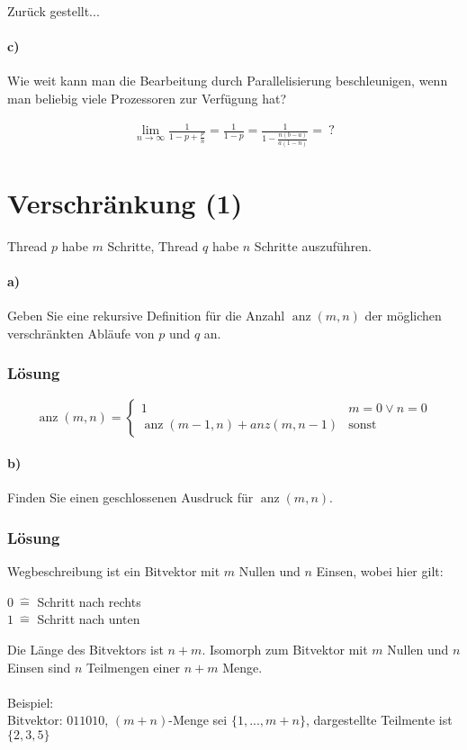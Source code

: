 \documentclass[a4paper]{scrartcl}
\DeclareMathOperator{\anz}{anz}
\begin{document}
Zurück gestellt...

\paragraph{c)} Wie weit kann man die Bearbeitung durch Parallelisierung beschleunigen, wenn man beliebig viele Prozessoren zur Verfügung hat?

\begin{align*}
\lim\limits_{n \to \infty} \frac{1}{1 - p + \frac{p}{n}} = \frac{1}{1 - p} = \frac{1}{1 - \frac{n \left(b - a\right)}{a \left(1 - n\right)}} = \ ?
\end{align*}

\section{Verschränkung (1)}

Thread $ p $ habe $ m $ Schritte, Thread $ q $ habe $ n $ Schritte auszuführen.

\paragraph{a)} Geben Sie eine rekursive Definition für die Anzahl $ \anz(m, n) $ der möglichen verschränkten Abläufe von $ p $ und $ q $ an.


\subsubsection*{Lösung}
\begin{equation*}
\anz(m, n) = 
\begin{cases}
1 & m = 0 \vee n = 0\\
\anz(m - 1, n) + anz(m, n - 1) & \text{sonst}
\end{cases}
\end{equation*}

\paragraph{b)} Finden Sie einen geschlossenen Ausdruck für $ \anz(m, n) $.

\subsubsection*{Lösung}
Wegbeschreibung ist ein Bitvektor mit $ m $ Nullen und $ n $ Einsen, wobei hier gilt:
\begin{center}
$ 0 \ \widehat{=} $ Schritt nach rechts\\
$ 1 \ \widehat{=} $ Schritt nach unten
\end{center}
Die Länge des Bitvektors ist $ n + m $. Isomorph zum Bitvektor mit $ m $ Nullen und $ n $ Einsen sind $ n $ Teilmengen einer $ n + m $ Menge.\\
\\
Beispiel:\\
Bitvektor: $ 011010 $, %
$ (m + n) $-Menge sei $ \{1, ..., m + n\} $,
dargestellte Teilmente ist $ \{2, 3, 5\} $
\end{document}
